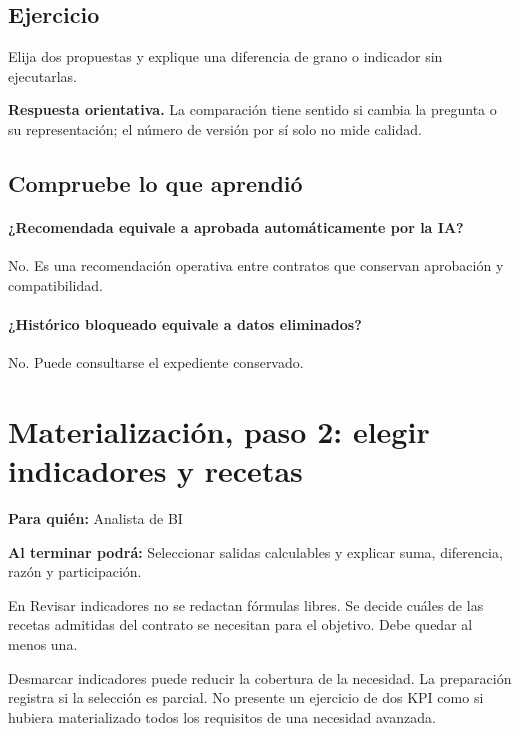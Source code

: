 \subsection{Ejercicio}
Elija dos propuestas y explique una diferencia de grano o indicador sin ejecutarlas.

\textbf{Respuesta orientativa.} La comparación tiene sentido si cambia la pregunta o su representación; el número de versión por sí solo no mide calidad.

\subsection{Compruebe lo que aprendió}
\paragraph{¿Recomendada equivale a aprobada automáticamente por la IA?} No. Es una recomendación operativa entre contratos que conservan aprobación y compatibilidad.

\paragraph{¿Histórico bloqueado equivale a datos eliminados?} No. Puede consultarse el expediente conservado.

\endgroup
{}

\section{Materialización, paso 2: elegir indicadores y recetas}
\label{unidad:ETL02}
\textbf{Para quién:} Analista de BI\par
\textbf{Al terminar podrá:} Seleccionar salidas calculables y explicar suma, diferencia, razón y participación.

En Revisar indicadores no se redactan fórmulas libres. Se decide cuáles de las recetas admitidas del contrato se necesitan para el objetivo. Debe quedar al menos una.

Desmarcar indicadores puede reducir la cobertura de la necesidad. La preparación registra si la selección es parcial. No presente un ejercicio de dos KPI como si hubiera materializado todos los requisitos de una necesidad avanzada.

